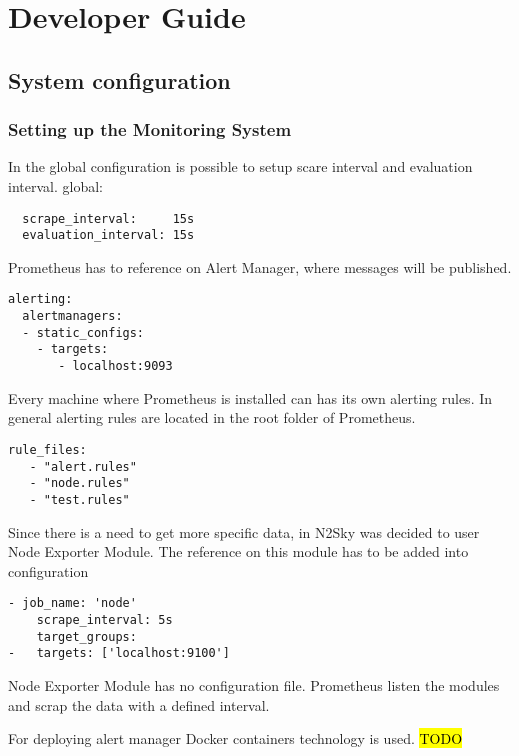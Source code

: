 \section{Developer Guide}\label{Developer Guide}

\subsection{System configuration}\label{System configuration}

\subsubsection{Setting up the Monitoring System}\label{Monitoring System setup}

 In the global configuration is possible to setup scare interval and evaluation interval.
global:
 
 \begin{lstlisting}
  scrape_interval:     15s 
  evaluation_interval: 15s 
\end{lstlisting}

Prometheus has to reference on Alert Manager, where messages will be published. 
 \begin{lstlisting}
alerting:
  alertmanagers:
  - static_configs:
    - targets:
       - localhost:9093
\end{lstlisting}

Every machine where Prometheus is installed can has its own alerting rules. In general alerting rules are located in the root folder of Prometheus.

 \begin{lstlisting}
rule_files:
   - "alert.rules"
   - "node.rules"
   - "test.rules"
\end{lstlisting}

Since there is a need to get more specific data, in N2Sky was decided to user Node Exporter Module. The reference on this module has to be added into configuration

 \begin{lstlisting}
- job_name: 'node'
    scrape_interval: 5s
    target_groups:
-	targets: ['localhost:9100']
\end{lstlisting}

Node Exporter Module has no configuration file. Prometheus listen the modules and scrap the data with a defined interval.

For deploying alert manager Docker containers technology is used.
\hl{TODO}

